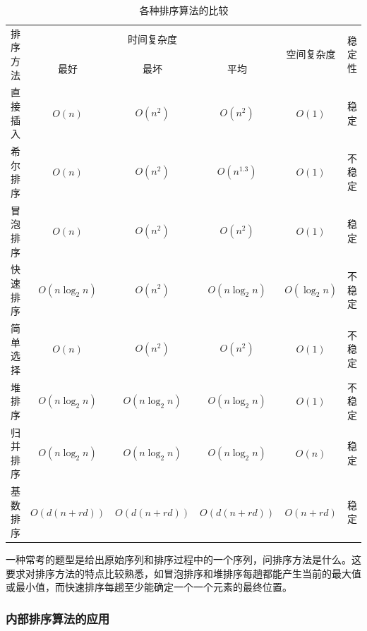 \documentclass[12pt, a4paper, oneside]{ctexart}
\begin{document}
\begin{table}
  \begin{center}
    \caption{各种排序算法的比较}
    \begin{tabular}{|c|c|c|c|c|c|}
      \hline
      \multirow{2}{*}{排序方法} & \multicolumn{3}{|c|}{时间复杂度} & \multirow{2}{*}{空间复杂度} & \multirow{2}{*}{稳定性} \\ \cline{2-4}
      & 最好 & 最坏 & 平均 & & \\ \hline
      直接插入 & $O(n)$ & $O(n^2)$ & $O(n^2)$ & $O(1)$ & 稳定 \\ \hline
      希尔排序 & $O(n)$ & $O(n^2)$ & $O(n^{1.3})$ & $O(1)$ & 不稳定 \\ \hline
      冒泡排序 & $O(n)$ & $O(n^2)$ & $O(n^2)$ & $O(1)$ & 稳定 \\ \hline
      快速排序 & $O(n\log_2 n)$ & $O(n^2)$ & $O(n\log_2 n)$ & $O(\log_2 n)$ & 不稳定 \\ \hline
      简单选择 & $O(n)$ & $O(n^2)$ & $O(n^2)$ & $O(1)$ & 不稳定 \\ \hline
      堆排序 & $O(n\log_2 n)$ & $O(n\log_2 n)$ & $O(n\log_2 n)$ & $O(1)$ & 不稳定 \\ \hline
      归并排序 & $O(n\log_2 n)$ & $O(n\log_2 n)$ & $O(n\log_2 n)$ & $O(n)$ & 稳定 \\ \hline
      基数排序 & $O(d(n+rd))$ & $O(d(n+rd))$ & $O(d(n+rd))$ & $O(n+rd)$ & 稳定 \\
      \hline
    \end{tabular}
  \end{center}
\end{table}

一种常考的题型是给出原始序列和排序过程中的一个序列，问排序方法是什么。这要求对排序方法的特点比较熟悉，如冒泡排序和堆排序每趟都能产生当前的最大值或最小值，而快速排序每趟至少能确定一个一个元素的最终位置。

\subsubsection{内部排序算法的应用}
\end{document}
